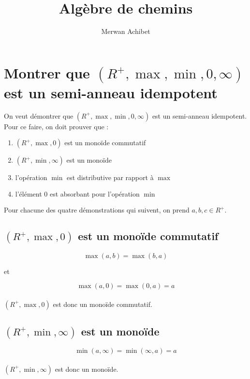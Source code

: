 \documentclass{article}
\title{Algèbre de chemins}
\author{Merwan Achibet}
\date{}
\begin{document}
\newcommand{\mmin}{\ensuremath{\operatorname{min}}}
\newcommand{\mmax}{\ensuremath{\operatorname{max}}}
\newcommand{\mMIN}{\ensuremath{\operatorname{MAX}}}
\newcommand{\mMAX}{\ensuremath{\operatorname{MAX}}}

\maketitle

\section{Montrer que $(R^+, \mmax, \mmin, 0,
  \infty)$ est un semi-anneau idempotent}

On veut démontrer que $(R^+, \mmax, \mmin, 0, \infty)$ est un
semi-anneau idempotent. Pour ce faire, on doit prouver que :

\begin{enumerate}
  \item{$(R^+, \mmax, 0)$ est un monoïde commutatif}
  \item{$(R^+, \mmin, \infty)$ est un monoïde}
  \item{l'opération $\mmin$ est distributive par rapport à $\mmax$}
  \item{l'élément $0$ est absorbant pour l'opération $\mmin$}
\end{enumerate}

Pour chacune des quatre démonstrations qui suivent, on prend $a, b, c \in R^+$.

\subsection{$(R^+, \mmax, 0)$ est un monoïde commutatif}

$$ \mmax(a, b) = \mmax(b, a)$$
\begin{center}et\end{center}
$$ \mmax(a, 0) = \mmax(0, a) = a $$\\

$(R^+, \mmax, 0)$ est donc un monoïde commutatif.

\subsection{$(R^+, \mmin, \infty)$ est un monoïde}

$$ \mmin(a, \infty) = \mmin(\infty, a) = a$$\\

$(R^+, \mmin, \infty)$ est donc un monoïde.
\end{document}
